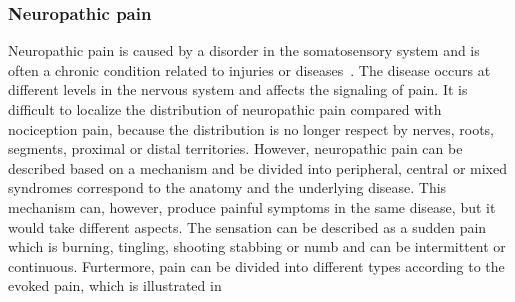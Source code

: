 \subsubsection{Neuropathic pain}
Neuropathic pain is caused by a disorder in the somatosensory system and is often a chronic condition related to injuries or diseases~\cite{Mindruta2013}. The disease occurs at different levels in the nervous system and affects the signaling of pain. It is difficult to localize the distribution of neuropathic pain compared with nociception pain, because the distribution is no longer respect by nerves, roots, segments, proximal or distal territories. However, neuropathic pain can be described based on a mechanism and be divided into peripheral, central or mixed syndromes correspond to the anatomy and the underlying disease. This mechanism can, however, produce painful symptoms in the same disease, but it would take different aspects. The sensation can be described as a sudden pain which is burning, tingling, shooting stabbing or numb and can be intermittent or continuous. Furtermore, pain can be divided into different types according to the evoked pain, which is illustrated in 


